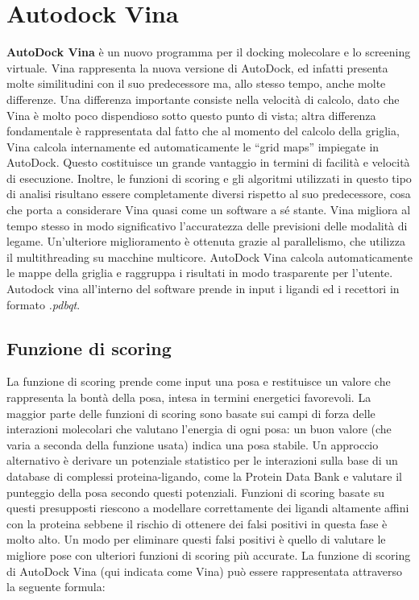 \section{Autodock Vina}
\textbf{AutoDock Vina} è  un nuovo programma per il docking molecolare e lo screening virtuale. Vina rappresenta la nuova versione di AutoDock, ed infatti presenta molte similitudini con il suo predecessore ma, allo stesso tempo, anche molte differenze. Una differenza importante consiste nella velocità di calcolo, dato che Vina è molto poco dispendioso sotto questo punto di vista; altra differenza fondamentale è rappresentata dal fatto che al momento del calcolo della griglia, Vina calcola internamente ed automaticamente le “grid maps” impiegate in AutoDock. Questo costituisce un grande vantaggio in termini di facilità e velocità di esecuzione. Inoltre, le funzioni di scoring e gli algoritmi utilizzati in questo tipo di analisi risultano essere completamente diversi rispetto al suo predecessore, cosa che porta a considerare Vina quasi come un software a sé stante. Vina migliora al tempo stesso in modo significativo l'accuratezza delle previsioni delle modalità di legame. Un'ulteriore miglioramento è ottenuta grazie al parallelismo, che utilizza il multithreading su macchine multicore. AutoDock Vina calcola automaticamente le mappe della griglia e raggruppa i risultati in modo trasparente per l'utente. Autodock vina all'interno del software prende in input i ligandi ed i recettori in formato \textit{.pdbqt}\cite{huey2012using}.

\subsection{Funzione di scoring}
La funzione di scoring prende come input una posa e restituisce un valore che rappresenta la bontà della posa, intesa in termini energetici favorevoli. La maggior parte delle funzioni di scoring sono basate sui campi di forza delle interazioni molecolari che valutano l’energia di ogni posa: un buon valore (che varia a seconda della funzione usata) indica una posa stabile. Un approccio alternativo è derivare un potenziale statistico per le interazioni sulla base di un database di complessi proteina-ligando, come la Protein Data Bank e valutare il punteggio della posa secondo questi potenziali. Funzioni di scoring basate su questi presupposti riescono a modellare correttamente dei ligandi altamente affini con la proteina sebbene il rischio di ottenere dei falsi positivi in questa fase è molto alto. Un modo per eliminare questi falsi positivi è quello di valutare le migliore pose con ulteriori funzioni
di scoring più accurate.\newline
La funzione di scoring di AutoDock Vina (qui indicata come Vina) può essere rappresentata attraverso la seguente formula:

